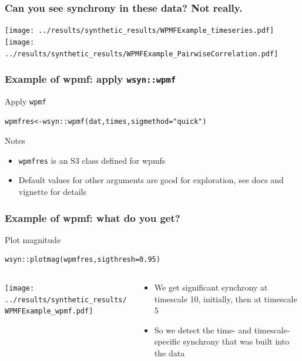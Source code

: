 \documentclass{beamer}
\begin{document}
\begin{frame}
\frametitle{Can you see synchrony in these data? Not really.}
\texttt{[image: ../results/synthetic\_results/WPMFExample\_timeseries.pdf]}
\texttt{[image: ../results/synthetic\_results/WPMFExample\_PairwiseCorrelation.pdf]}
\end{frame}

\begin{frame}[fragile]
\frametitle{Example of wpmf: apply \texttt{wsyn::wpmf}}
\begin{exampleblock}{Apply \texttt{wpmf}}
\begin{verbatim}
wpmfres<-wsyn::wpmf(dat,times,sigmethod="quick")
\end{verbatim}
\end{exampleblock}
\begin{block}{Notes}
\begin{itemize}
\item \texttt{wpmfres} is an S3 class defined for wpmfs 
\item Default values for other arguments are good for exploration, see docs and vignette for details
\end{itemize}
\end{block}
\end{frame}

\begin{frame}[fragile]
\frametitle{Example of wpmf: what do you get?}
\begin{exampleblock}{Plot magnitude}
\begin{verbatim}
wsyn::plotmag(wpmfres,sigthresh=0.95)
\end{verbatim}
\end{exampleblock}
\begin{columns}[c]
\begin{column}{6cm}
\texttt{[image: ../results/synthetic\_results/WPMFExample\_wpmf.pdf]}
\end{column}
\begin{column}{6cm}
\begin{itemize}
\item We get significant synchrony at timescale 10, initially, then at timescale 5
\item So we detect the time- and timescale-specific synchrony that was built into the data
\end{itemize}
\end{column}
\end{columns}
\end{frame}
\end{document}
